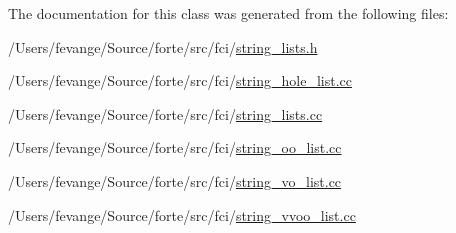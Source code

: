 The documentation for this class was generated from the following files\+:\begin{DoxyCompactItemize}
\item 
/\+Users/fevange/\+Source/forte/src/fci/\mbox{\hyperlink{string__lists_8h}{string\+\_\+lists.\+h}}\item 
/\+Users/fevange/\+Source/forte/src/fci/\mbox{\hyperlink{string__hole__list_8cc}{string\+\_\+hole\+\_\+list.\+cc}}\item 
/\+Users/fevange/\+Source/forte/src/fci/\mbox{\hyperlink{string__lists_8cc}{string\+\_\+lists.\+cc}}\item 
/\+Users/fevange/\+Source/forte/src/fci/\mbox{\hyperlink{string__oo__list_8cc}{string\+\_\+oo\+\_\+list.\+cc}}\item 
/\+Users/fevange/\+Source/forte/src/fci/\mbox{\hyperlink{string__vo__list_8cc}{string\+\_\+vo\+\_\+list.\+cc}}\item 
/\+Users/fevange/\+Source/forte/src/fci/\mbox{\hyperlink{string__vvoo__list_8cc}{string\+\_\+vvoo\+\_\+list.\+cc}}\end{DoxyCompactItemize}
